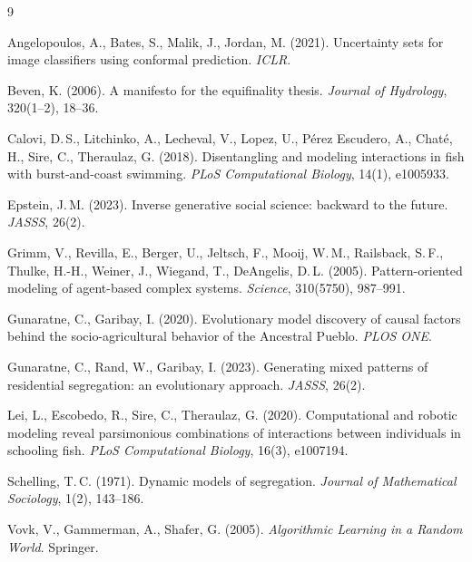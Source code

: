 \documentclass[11pt]{article}
\begin{document}
\begin{thebibliography}{9}
\small

Angelopoulos, A., Bates, S., Malik, J., Jordan, M. (2021).
Uncertainty sets for image classifiers using conformal prediction.
\emph{ICLR}.

Beven, K. (2006).
A manifesto for the equifinality thesis.
\emph{Journal of Hydrology}, 320(1--2), 18--36.

Calovi, D.\,S., Litchinko, A., Lecheval, V., Lopez, U., P\'erez Escudero, A.,
Chat\'e, H., Sire, C., Theraulaz, G. (2018).
Disentangling and modeling interactions in fish with burst-and-coast swimming.
\emph{PLoS Computational Biology}, 14(1), e1005933.

Epstein, J.\,M. (2023).
Inverse generative social science: backward to the future.
\emph{JASSS}, 26(2).

Grimm, V., Revilla, E., Berger, U., Jeltsch, F., Mooij, W.\,M., Railsback, S.\,F.,
Thulke, H.-H., Weiner, J., Wiegand, T., DeAngelis, D.\,L. (2005).
Pattern-oriented modeling of agent-based complex systems.
\emph{Science}, 310(5750), 987--991.

Gunaratne, C., Garibay, I. (2020).
Evolutionary model discovery of causal factors behind the socio-agricultural
behavior of the Ancestral Pueblo.
\emph{PLOS ONE}.

Gunaratne, C., Rand, W., Garibay, I. (2023).
Generating mixed patterns of residential segregation: an evolutionary approach.
\emph{JASSS}, 26(2).

Lei, L., Escobedo, R., Sire, C., Theraulaz, G. (2020).
Computational and robotic modeling reveal parsimonious combinations of interactions
between individuals in schooling fish.
\emph{PLoS Computational Biology}, 16(3), e1007194.

Schelling, T.\,C. (1971).
Dynamic models of segregation.
\emph{Journal of Mathematical Sociology}, 1(2), 143--186.

Vovk, V., Gammerman, A., Shafer, G. (2005).
\emph{Algorithmic Learning in a Random World}. Springer.

\end{thebibliography}
\end{document}
